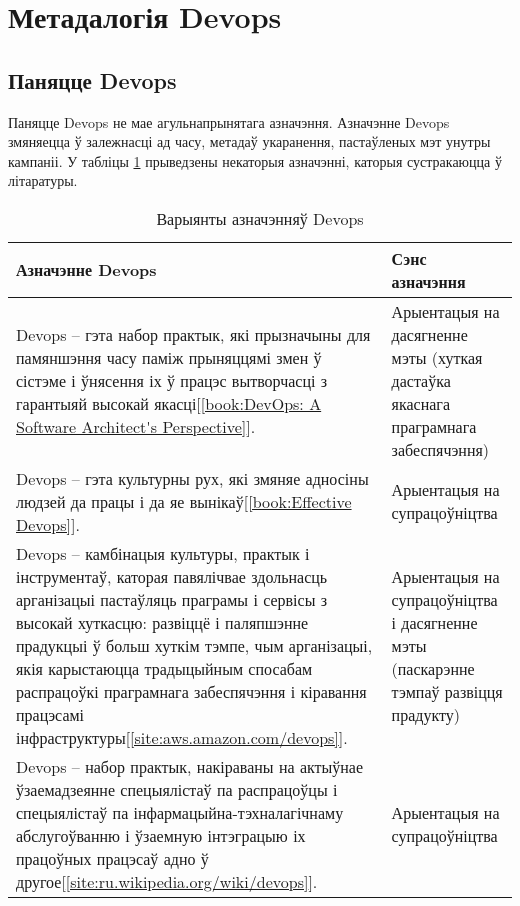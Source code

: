 \section{Метадалогія Devops}

\subsection{Паняцце Devops}

Паняцце Devops не мае агульнапрынятага азначэння.
Азначэнне Devops змяняецца ў залежнасці ад часу, метадаў укаранення,
пастаўленых мэт унутры кампаніі.
У табліцы \ref{table:Definition of Devops} прыведзены некаторыя
азначэнні, каторыя сустракаюцца ў літаратуры.

\begin{table}[htbp]
    \caption{Варыянты азначэнняў Devops}
    \begin{tabular}{|p{}|p{}|} 
        \hline
        \textbf{Азначэнне Devops}
        &
        \textbf{Сэнс азначэння}  \\ 
        \hline
        Devops -- гэта набор практык, які прызначыны для
        памяншэння часу паміж прыняццямі змен ў сістэме і
        ўнясення іх ў працэс вы\-твор\-час\-ці з гарантыяй
        высокай якасці[\ref{book:DevOps: A Software Architect's Perspective}].
        &
        Арыентацыя на дасягненне мэты (хуткая дастаўка
        якаснага праграмнага забеспячэння) \\ 
        \hline
        Devops -- гэта культурны рух, які змяняе адносіны людзей
        да працы і да яе вынікаў[\ref{book:Effective Devops}].
        & Арыентацыя на супрацоўніцтва \\ 
        \hline
        Devops -- камбінацыя культуры, практык і інструментаў,
        каторая павялічвае здольнасць арганізацыі
        пастаўляць праграмы і сервісы
        з высокай хут\-кас\-цю: развіццё і паляпшэнне прадукцыі
        ў больш хуткім тэмпе,
        чым арганізацыі, якія карыстаюцца традыцыйным спосабам распрацоўкі
        праграмнага забеспячэння і
        кіравання працэсамі інфраструктуры[\ref{site:aws.amazon.com/devops}].
        & Арыентацыя на супрацоўніцтва і дасягненне мэты
        (паскарэнне тэм\-паў развіцця прадукту) \\
        \hline
        Devops -- набор практык, накіраваны на актыўнае ўзаемадзеянне
        спецыялістаў па распрацоўцы і
        спецыялістаў па інфармацыйна-тэхналагічнаму
        абслугоўванню і ўзаемную інтэграцыю
        іх працоўных працэсаў
        адно ў другое[\ref{site:ru.wikipedia.org/wiki/devops}].
        &
        Арыентацыя на супрацоўніцтва \\
        \hline
    \end{tabular}
    \label{table:Definition of Devops}
\end{table}

